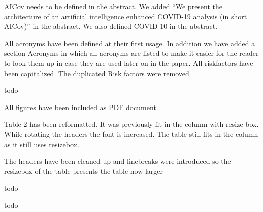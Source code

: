    {AICov needs to be defined in the abstract.}
  {We added ``We present the architecture of an artificial
    intelligence enhanced COVID-19 analysis (in short AICov)''
  in the abstract. We also defined COVID-10 in the abstract.}

  {All acronyms have been defined at their first usage. In addition
    we have added a section Acronyms in which all acronyms are listed
    to make it easier for the reader to look them up in case they are
    used later on in the paper. All riskfactors have been capitalized.
    The duplicated Risk factors were removed.
  }
  

  { todo}


  { All figures have been included as PDF document. }


  { Table 2 has been reformatted. It was previously fit in the column
    with resize box. While rotating the headers the font is
    increased. The table still fits in the column as it still uses
    resizebox.}

  { The headers have been cleaned up and linebreaks were introduced so
    the resizebox of the table presents the table now larger} 

  { todo}


  { todo}


